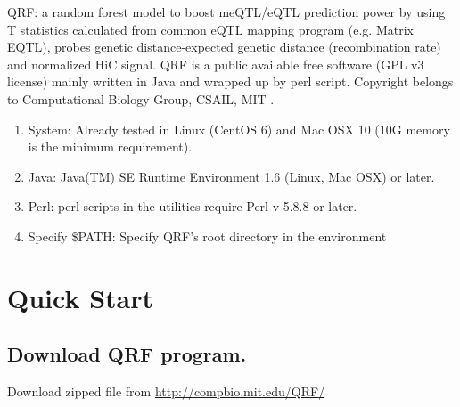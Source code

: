 \documentclass[12pt]{article}
\author{Yaping Liu}
\date{Jul. 15. 2015} %
\begin{document}
\maketitle
\tableofcontents



{}
QRF: a random forest model to boost meQTL/eQTL prediction power by using T statistics calculated from common eQTL mapping program (e.g. Matrix EQTL), probes genetic distance-expected genetic distance (recombination rate) and normalized HiC signal. QRF is a public available free software (GPL v3 license) mainly written in Java and wrapped up by perl script. Copyright belongs to Computational Biology Group, CSAIL, MIT .

{}
\begin{enumerate}
\item System: Already tested in Linux (CentOS 6) and Mac OSX 10 (10G memory is the minimum requirement). 
\item Java: Java(TM) SE Runtime Environment 1.6 (Linux, Mac OSX) or later.
\item Perl: perl scripts in the utilities require Perl v 5.8.8 or later.
\item Specify \$PATH: Specify QRF's root directory in the environment

\end{enumerate}

{\color{red}\section{Quick Start}}

{\color{blue}\subsection{Download QRF program.}}
Download zipped file from \url{http://compbio.mit.edu/QRF/}
\end{document}
